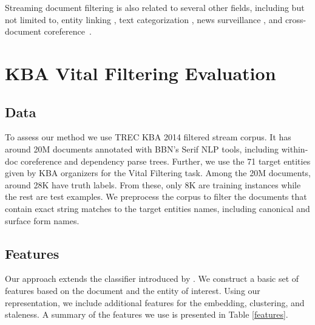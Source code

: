 \documentclass{article}
\begin{document}
Streaming document filtering is also related to several other fields, including but not limited to, entity linking \cite{KBP11}, text categorization \cite{HLTCOE12}, news surveillance \cite{Steinberger14}, and cross-document coreference~\cite{RaoMD10,singh11:acl}.


\section{KBA Vital Filtering Evaluation}
\label{evaluation}

\subsection{Data}
\label{data}

To assess our method we use TREC KBA 2014 filtered stream corpus. It has around 20M documents annotated with BBN's Serif NLP tools, including within-doc coreference and dependency parse trees. Further, we use the 71 target entities given by KBA organizers for the Vital Filtering task. Among the 20M documents, around 28K have truth labels. From these, only 8K are training instances while the rest are test examples.
We preprocess the corpus to filter the documents that contain exact string matches to the target entities names, including canonical and surface form names.

\subsection{Features}
\label{feat}

Our approach extends the classifier introduced by \citet{jingang13}.
We construct a basic set of features based on the document and the entity of interest.
Using our representation, we include additional features for the embedding, clustering, and staleness.
A summary of the features we use is presented in Table \ref{features}. 

\end{document}
